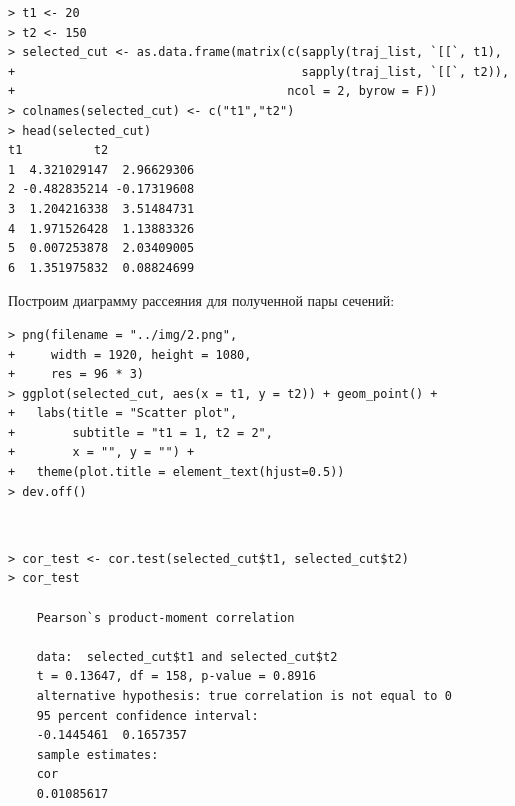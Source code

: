 \documentclass[14pt,a4paper]{scrartcl}
\begin{document}
\begin{verbatim}
> t1 <- 20
> t2 <- 150
> selected_cut <- as.data.frame(matrix(c(sapply(traj_list, `[[`, t1),
+                                        sapply(traj_list, `[[`, t2)),
+                                      ncol = 2, byrow = F))
> colnames(selected_cut) <- c("t1","t2")
> head(selected_cut)
t1          t2
1  4.321029147  2.96629306
2 -0.482835214 -0.17319608
3  1.204216338  3.51484731
4  1.971526428  1.13883326
5  0.007253878  2.03409005
6  1.351975832  0.08824699
\end{verbatim}

Построим диаграмму рассеяния для полученной пары сечений:

\begin{verbatim}
> png(filename = "../img/2.png",
+     width = 1920, height = 1080,
+     res = 96 * 3)
> ggplot(selected_cut, aes(x = t1, y = t2)) + geom_point() +
+   labs(title = "Scatter plot",
+        subtitle = "t1 = 1, t2 = 2",
+        x = "", y = "") + 
+   theme(plot.title = element_text(hjust=0.5))
> dev.off()
\end{verbatim}

\begin{figure}[H]
	\begin{minipage}[h]{1\linewidth}
		  \\
	\end{minipage}
\end{figure}


\begin{verbatim}
> cor_test <- cor.test(selected_cut$t1, selected_cut$t2)
> cor_test

	Pearson`s product-moment correlation
	
	data:  selected_cut$t1 and selected_cut$t2
	t = 0.13647, df = 158, p-value = 0.8916
	alternative hypothesis: true correlation is not equal to 0
	95 percent confidence interval:
	-0.1445461  0.1657357
	sample estimates:
	cor 
	0.01085617 
\end{verbatim}
\end{document}
